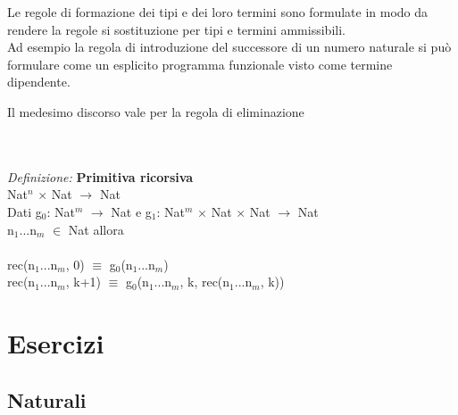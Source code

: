 \noindent
\normalsize
Le regole di formazione dei tipi e dei loro termini sono formulate in modo da rendere la regole si sostituzione per tipi e termini ammissibili.\\
Ad esempio la regola di introduzione del successore di un numero naturale si pu\`o formulare come un esplicito programma funzionale visto come termine dipendente.
\begin{prooftree}
\end{prooftree}
Il medesimo discorso vale per la regola di eliminazione
\begin{prooftree}
\end{prooftree}
\noindent\\\\
\textit{Definizione:} \textbf{Primitiva ricorsiva}\\
Nat$^n$ $\times$ Nat $\rightarrow$ Nat\\
Dati g$_0$: Nat$^m$ $\rightarrow$ Nat e g$_1$: Nat$^m$ $\times$ Nat $\times$ Nat $\rightarrow$ Nat\\
n$_1$...n$_m$ $\in$ Nat allora\\\\
rec(n$_1$...n$_m$, 0) $\equiv$ g$_0$(n$_1$...n$_m$)\\
rec(n$_1$...n$_m$, k+1) $\equiv$ g$_0$(n$_1$...n$_m$, k, rec(n$_1$...n$_m$, k))

\section{Esercizi}
\label{sec:esercizi-cap3}

\subsection{Naturali}
\label{subsec: naturali}
